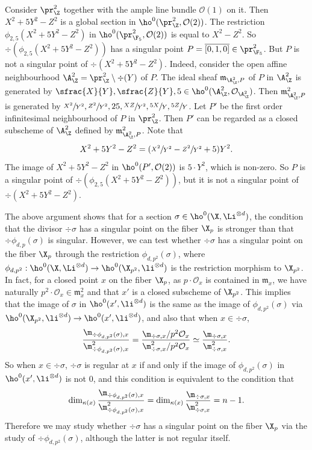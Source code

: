 \begin{expl}
Consider $\pr^2_{\Z}$ together with the ample line bundle $\mathcal{O}(1)$ on it. Then $X^2+5Y^2-Z^2$ is a global section in $\ho^0(\pr^2_{\Z}, \mathcal{O}(2))$. The restriction $\phi_{2,5}(X^2+5Y^2-Z^2)$ in $\ho^0(\pr^2_{\F_5}, \mathcal{O}(2))$ is equal to $X^2-Z^2$. So $\div (\phi_{2,5}(X^2+5Y^2-Z^2))$ has a singular point $P=\overline{[0,1,0]}\in \pr^2_{\F_5}$. But $P$ is not a singular point of $\div (X^2+5Y^2-Z^2)$. Indeed, consider the open affine neighbourhood $\A^2_{\Z}=\pr^2_{\Z}\setminus\div (Y)$ of $P$. The ideal sheaf $\mathfrak{m}_{\A^2_{\Z},P}$ of $P$ in $\A^2_{\Z}$ is generated by $\sfrac{X}{Y},\sfrac{Z}{Y},5\in \ho^0(\A^2_{\Z}, \mathcal{O}_{\A^2_{\Z}})$. Then $\mathfrak{m}^2_{\A^2_{\Z},P}$ is generated by $\sfrac{X^2}{Y^2}, \sfrac{Z^2}{Y^2}, 25, \sfrac{XZ}{Y^2}, \sfrac{5X}{Y},\sfrac{5Z}{Y}$. Let $P'$ be the first order infinitesimal neighbourhood of $P$ in $\pr^2_{\Z}$. Then $P'$ can be regarded as a closed subscheme of $\A^2_{\Z}$ defined by $\mathfrak{m}^2_{\A^2_{\Z},P}$. Note that
\begin{align*}
X^2+5Y^2-Z^2 = (\sfrac{X^2}{Y^2}-\sfrac{Z^2}{Y^2}+5)Y^2.
\end{align*}
The image of $X^2+5Y^2-Z^2$ in $\ho^0(P', \mathcal{O}(2))$ is $5\cdot Y^2$, which is non-zero. So $P$ is a singular point of $\div (\phi_{2,5}(X^2+5Y^2-Z^2))$, but it is not a singular point of $\div (X^2+5Y^2-Z^2)$.
\end{expl}

The above argument shows that for a section $\sigma \in \ho^0(\X,\Li^{\otimes d})$, the condition that the divisor $\div \sigma$ has a singular point on the fiber $\X_p$ is stronger than that $\div \phi_{d,p}(\sigma)$ is singular. However, we can test whether $\div \sigma$ has a singular point on the fiber $\X_p$ through the restriction $\phi_{d,p^2}(\sigma)$, where $\phi_{d,p^2}: \ho^0(\X, \Li^{\otimes d})\to \ho^0(\X_{p^2}, \li^{\otimes d})$ is the restriction morphism to $\X_{p^2}$. In fact, for a closed point $x$ on the fiber $\X_p$, as $p\cdot\mathcal{O}_x$ is contained in $\mathfrak{m}_x$, we have naturally $p^2\cdot\mathcal{O}_x\in \mathfrak{m}^2_x$ and that $x'$ is a closed subscheme of $\X_{p^2}$. This implies that the image of $\sigma$ in $\ho^0(x', \li^{\otimes d})$ is the same as the image of $\phi_{d,p^2}(\sigma)$ via $\ho^0(\X_{p^2}, \li^{\otimes d})\to \ho^0(x', \li^{\otimes d})$, and also that when $x\in \div \sigma$,
\[
\frac{\m_{\div \phi_{d,p^2}(\sigma),x}}{\m^2_{\div \phi_{d,p^2}(\sigma), x}}=\frac{\m_{\div \sigma,x}/p^2\mathcal{O}_x}{\m^2_{\div \sigma, x}/p^2\mathcal{O}_x}\simeq\frac{\m_{\div \sigma,x}}{\m^2_{\div \sigma, x}}.
\]
So when $x\in\div \sigma$, $\div \sigma$ is regular at $x$ if and only if the image of $\phi_{d,p^2}(\sigma)$ in $\ho^0(x', \li^{\otimes d})$ is not $0$, and this condition is equivalent to the condition that
\[
\dim_{\kappa(x)}\frac{\m_{\div \phi_{d,p^2}(\sigma),x}}{\m^2_{\div \phi_{d,p^2}(\sigma), x}}=\dim_{\kappa(x)}\frac{\m_{\div \sigma,x}}{\m^2_{\div \sigma, x}}=n-1.
\]
Therefore we may study whether $\div \sigma$ has a singular point on the fiber $\X_p$ via the study of $\div \phi_{d,p^2}(\sigma)$, although the latter is not regular itself.

